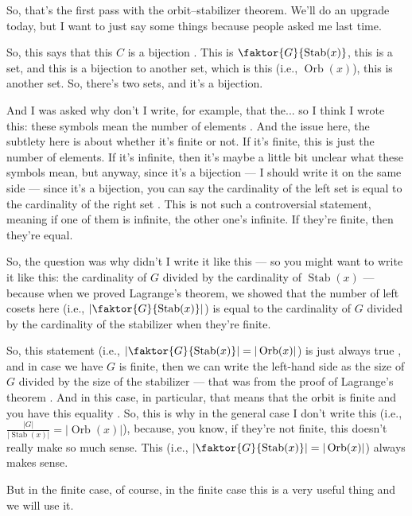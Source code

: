\begin{speech}[00:02:28 - 00:04:46]
So, that's the first pass with the orbit--stabilizer theorem. We'll do an upgrade today, but I want to just say some things because people asked me last time.

So, this says that this $C$ is a bijection . This is $\faktor{G}{\operatorname{Stab}(x)}$, this is a set, and this is a bijection to another set, which is this (i.e., $\operatorname{Orb}(x)$), this is another set. So, there's two sets, and it's a bijection.

And I was asked why don't I write, for example, that the... so I think I wrote this: these symbols mean the number of elements . And the issue here, the subtlety here is about whether it's finite or not. If it's finite, this is just the number of elements. If it's infinite, then it's maybe a little bit unclear what these symbols mean, but anyway, since it's a bijection --- I should write it on the same side  --- since it's a bijection, you can say the cardinality of the left set is equal to the cardinality of the right set . This is not such a controversial statement, meaning if one of them is infinite, the other one's infinite. If they're finite, then they're equal.

So, the question was why didn't I write it like this --- so you might want to write it like this: the cardinality of $G$ divided by the cardinality of $\operatorname{Stab}(x)$  --- because when we proved Lagrange's theorem, we showed that the number of left cosets here (i.e., $\left|\faktor{G}{\operatorname{Stab}(x)}\right|$) is equal to the cardinality of $G$ divided by the cardinality of the stabilizer when they're finite.

So, this statement (i.e., $\left|\faktor{G}{\operatorname{Stab}(x)}\right| = |\operatorname{Orb}(x)|$) is just always true , and in case we have $G$ is finite, then we can write the left-hand side as the size of $G$ divided by the size of the stabilizer --- that was from the proof of Lagrange's theorem . And in this case, in particular, that means that the orbit is finite and you have this equality . So, this is why in the general case I don't write this (i.e., $\frac{|G|}{|\operatorname{Stab}(x)|} = |\operatorname{Orb}(x)|$), because, you know, if they're not finite, this doesn't really make so much sense. This (i.e., $\left|\faktor{G}{\operatorname{Stab}(x)}\right| = |\operatorname{Orb}(x)|$) always makes sense.

But in the finite case, of course, in the finite case this is a very useful thing and we will use it.
\end{speech}

